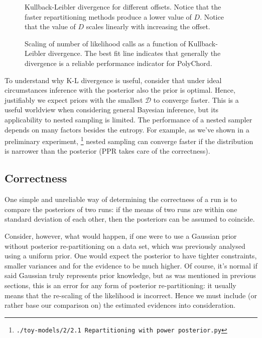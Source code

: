\documentclass[usenatbib]{mnras}
\begin{document}
\begin{figure}
  
\caption{Kullback-Leibler divergence for different offsets. Notice that the faster repartitioning methods produce a lower value of \(D\). Notice that the value of \(D\) scales linearly with increasing the offset. \label{fig:kl-d}}
\end{figure}

\begin{figure}
  
\caption{Scaling of number of likelihood calls as a function of Kullback-Leibler divergence. The best fit line indicates that generally the divergence is a reliable performance indicator for PolyChord. \label{fig:kl-scaling}}
\end{figure}

To understand why K-L divergence is useful, consider that under
ideal circumstances inference with the posterior also the prior is
optimal. Hence, justifiably we expect priors with the smallest
\(\mathcal{D}\) to converge faster. This is a useful worldview when
considering general Bayesian inference, but its applicability to
nested sampling is limited. The performance of a nested sampler
depends on many factors besides the entropy. For example, as we've
shown in a preliminary experiment, \footnote{\texttt{./toy-models/2/2.1 Repartitioning with power posterior.py}} nested sampling can
converge faster if the distribution is narrower than the posterior
(PPR takes care of the correctness). 



\subsection{Correctness}
\label{sec:org364e2bf}
One simple and unreliable way of determining the correctness of a
run is to compare the posteriors of two runs: if the means of two
runs are within one standard deviation of each other, then the
posteriors can be assumed to coincide.

Consider, however, what would happen, if one were to use a Gaussian
prior without posterior re-partitioning on a data set, which was
previously analysed using a uniform prior. One would expect the
posterior to have tighter constraints, smaller variances and for
the evidence to be much higher. Of course, it's normal if said
Gaussian truly represents prior knowledge, but as was mentioned in
previous sections, this is an error for any form of posterior
re-partitioning: it usually means that the re-scaling of the
likelihood is incorrect. Hence we must include (or rather base our
comparison on) the estimated evidences into consideration.
\end{document}
